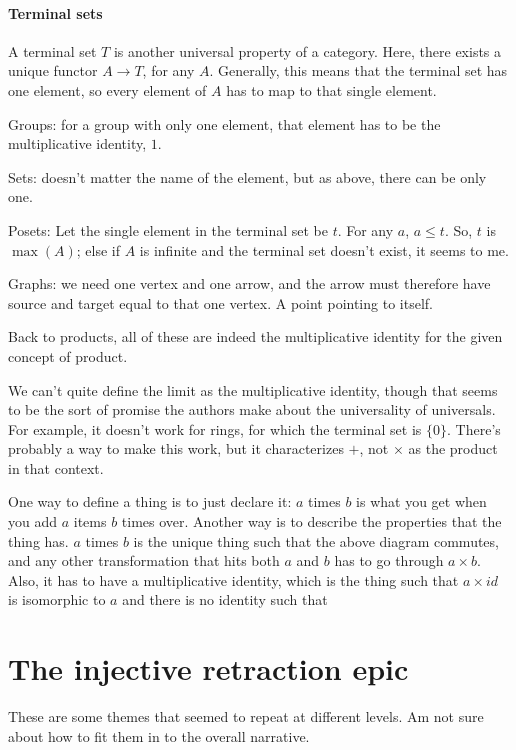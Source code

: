 \documentclass[11pt]{article}
\begin{document}
\paragraph{Terminal sets} A terminal set $T$ is another universal property of a
category. Here, there exists a unique functor $A\to T$, for any $A$. Generally, this
means that the terminal set has one element, so every element of $A$ has to map to
that single element.

Groups: for a group with only one element, that element has to be the multiplicative identity, $1$.

Sets: doesn't matter the name of the element, but as above, there can be only one.

Posets: Let the single element in the terminal set be $t$. For any $a$, $a\leq t$. So, $t$
is $\max(A)$; else if $A$ is infinite and the terminal set doesn't exist, it seems to me.

Graphs: we need one vertex and one arrow, and the arrow must therefore have source and
target equal to that one vertex. A point pointing to itself.

Back to products, all of these are indeed the multiplicative identity for the given
concept of product.

We can't quite define the limit as the multiplicative identity, though that seems to be
the sort of  promise the authors make about the universality of universals. For example,
it doesn't work for rings, for which the terminal set is $\{0\}$. There's probably a way
to make this work, but it characterizes $+$, not $\times$ as the product in that context.

One way to define a thing is to just declare it: $a$ times $b$ is what you get when you
add $a$ items $b$ times over. Another way is to describe the properties that the thing
has. $a$ times $b$ is the unique thing such that the above diagram commutes, and any other
transformation that hits both $a$ and $b$ has to go through $a\times b$. Also, it has to
have a multiplicative identity, which is the thing such that $a\times id$ is isomorphic
to $a$ and there is no identity such that 

\section{The injective retraction epic}\label{injectivesec}
These are some themes that seemed to repeat at
different levels. Am not sure about how to fit them in to the overall narrative.
\end{document}
